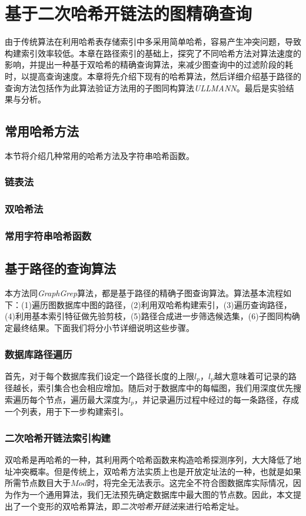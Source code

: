 \documentclass{XDBAthesis}
\numberwithin{algorithm}{chapter}
\begin{document}
\else
\fi
\chapter{基于二次哈希开链法的图精确查询}
\label{chap:graphgrep}
由于传统算法在利用哈希表存储索引中多采用简单哈希，容易产生冲突问题，导致构建索引效率较低。本章在路径索引的基础上，探究了不同哈希方法对算法速度的影响，并提出一种基于双哈希的精确查询算法，来减少图查询中的过滤阶段的耗时，以提高查询速度。本章将先介绍下现有的哈希算法，然后详细介绍基于路径的查询方法包括作为此算法验证方法用的子图同构算法\emph{ULLMANN}\cite{ullmann}。最后是实验结果与分析。

\section{常用哈希方法}
本节将介绍几种常用的哈希方法及字符串哈希函数。
\subsection{链表法}
\subsection{双哈希法}
\subsection{常用字符串哈希函数}

\section{基于路径的查询算法}
本方法同\emph{GraphGrep}算法\cite{graphgrep}，都是基于路径的精确子图查询算法。算法基本流程如下：(1)遍历图数据库中图的路径，(2)利用双哈希构建索引，(3)遍历查询路径，(4)利用基本索引特征做先验剪枝，(5)路径合成进一步筛选候选集，(6)子图同构确定最终结果。下面我们将分小节详细说明这些步骤。
\subsection{数据库路径遍历}
首先，对于每个数据库我们设定一个路径长度的上限$l_p $，$l_p $越大意味着可记录的路径越长，索引集合也会相应增加。随后对于数据库中的每幅图，我们用深度优先搜索遍历每个节点，遍历最大深度为$l_p $，并记录遍历过程中经过的每一条路径，存成一个列表，用于下一步构建索引。
\subsection{二次哈希开链法索引构建}
双哈希是再哈希的一种，其利用两个哈希函数来构造哈希探测序列，大大降低了地址冲突概率。但是传统上，双哈希方法实质上也是开放定址法的一种，也就是如果所需节点数目大于$Mod$时，将完全无法表示。这完全不符合图数据库实际情况，因为作为一个通用算法，我们无法预先确定数据库中最大图的节点数。因此，本文提出了一个变形的双哈希算法，即\emph{二次哈希开链法}来进行哈希定址。
\end{document}

